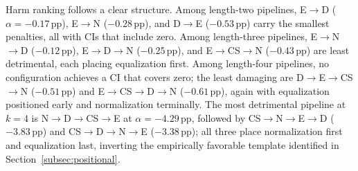 \documentclass[preprint,5p,times,twocolumn]{elsarticle}
\begin{document}
Harm ranking follows a clear structure. Among length-two pipelines, E$\to$D ($\alpha = -0.17$\,pp), E$\to$N ($-0.28$\,pp), and D$\to$E ($-0.53$\,pp) carry the smallest penalties, all with CIs that include zero. Among length-three pipelines, E$\to$N$\to$D ($-0.12$\,pp), E$\to$D$\to$N ($-0.25$\,pp), and E$\to$CS$\to$N ($-0.43$\,pp) are least detrimental, each placing equalization first. Among length-four pipelines, no configuration achieves a CI that covers zero; the least damaging are D$\to$E$\to$CS$\to$N ($-0.51$\,pp) and E$\to$CS$\to$D$\to$N ($-0.61$\,pp), again with equalization positioned early and normalization terminally. The most detrimental pipeline at $k=4$ is N$\to$D$\to$CS$\to$E at $\alpha = -4.29$\,pp, followed by CS$\to$N$\to$E$\to$D ($-3.83$\,pp) and CS$\to$D$\to$N$\to$E ($-3.38$\,pp); all three place normalization first and equalization last, inverting the empirically favorable template identified in Section~\ref{subsec:positional}.
\end{document}
